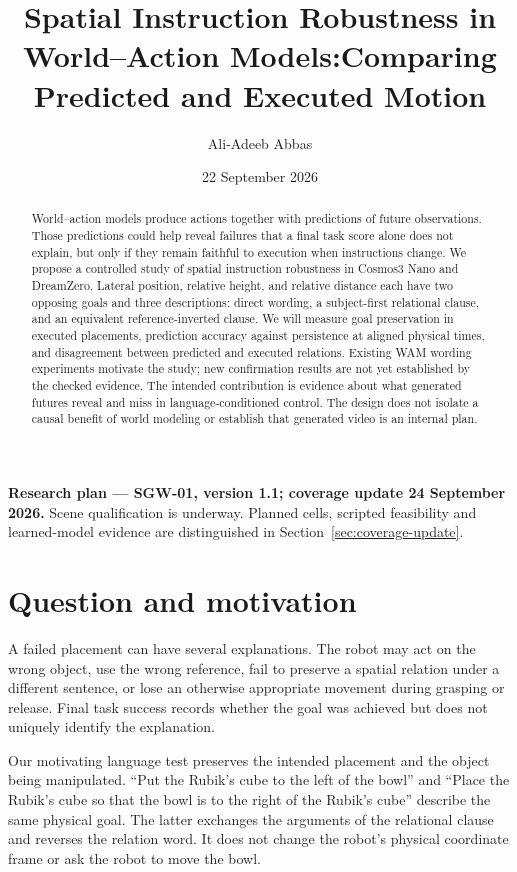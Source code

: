 \documentclass[11pt]{article}
\title{Spatial Instruction Robustness in World--Action Models:\newline Comparing Predicted and Executed Motion}
\author{Ali-Adeeb Abbas}
\date{22 September 2026}
\newcommand{\status}{\textbf{Research plan --- SGW-01, version 1.1; coverage update 24 September 2026.} Scene qualification is underway. Planned cells, scripted feasibility and learned-model evidence are distinguished in Section~\ref{sec:coverage-update}.}
\begin{document}
\maketitle
\begin{center}\small\color{ink}\status\end{center}

\begin{abstract}
World--action models produce actions together with predictions of future observations. Those predictions could help reveal failures that a final task score alone does not explain, but only if they remain faithful to execution when instructions change. We propose a controlled study of spatial instruction robustness in Cosmos3 Nano and DreamZero. Lateral position, relative height, and relative distance each have two opposing goals and three descriptions: direct wording, a subject-first relational clause, and an equivalent reference-inverted clause. We will measure goal preservation in executed placements, prediction accuracy against persistence at aligned physical times, and disagreement between predicted and executed relations. Existing WAM wording experiments motivate the study; new confirmation results are not yet established by the checked evidence. The intended contribution is evidence about what generated futures reveal and miss in language-conditioned control. The design does not isolate a causal benefit of world modeling or establish that generated video is an internal plan.
\end{abstract}

\section{Question and motivation}
A failed placement can have several explanations. The robot may act on the wrong object, use the wrong reference, fail to preserve a spatial relation under a different sentence, or lose an otherwise appropriate movement during grasping or release. Final task success records whether the goal was achieved but does not uniquely identify the explanation.

Our motivating language test preserves the intended placement and the object being manipulated. ``Put the Rubik's cube to the left of the bowl'' and ``Place the Rubik's cube so that the bowl is to the right of the Rubik's cube'' describe the same physical goal. The latter exchanges the arguments of the relational clause and reverses the relation word. It does not change the robot's physical coordinate frame or ask the robot to move the bowl.
\end{document}
